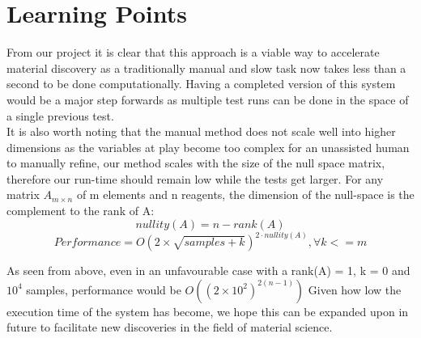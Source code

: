 \chapter{Learning Points}
\label{ch:learning-points}

From our project it is clear that this approach is a viable way to accelerate material discovery as a traditionally manual and slow task now takes less than a second to be done computationally. Having a completed version of this system would be a major step forwards as multiple test runs can be done in the space of a single previous test. \\

It is also worth noting that the manual method does not scale well into higher dimensions as the variables at play become too complex for an unassisted human to manually refine, our method scales with the size of the null space matrix, therefore our run-time should remain low while the tests get larger. For any matrix $A_{m \times n}$ of m elements and n reagents, the dimension of the null-space is the complement to the rank of A:
\begin{equation}
    nullity(A) = n - rank(A) 
\end{equation}
\begin{equation}
    Performance = O(2 \times \sqrt{samples + k})^{2 \cdot nullity(A)}, \forall k <= m 
\end{equation}

As seen from above, even in an unfavourable case with a rank(A) = 1, k = 0 and $10^{4}$ samples, performance would be $O((2 \times 10^{2})^{2(n-1)})$ 
Given how low the execution time of the system has become, we hope this can be expanded upon in future to facilitate new discoveries in the field of material science. 